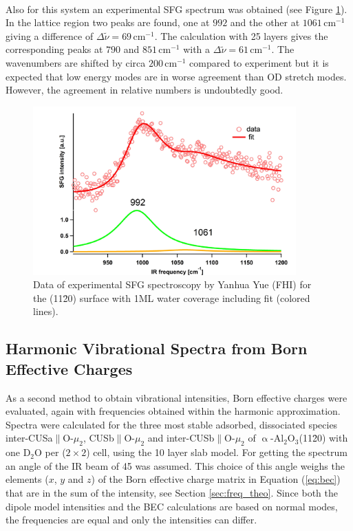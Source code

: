 \documentclass[11pt,DIV=13,BCOR=5mm,a4paper,headinclude]{scrbook}
\begin{document}
\\
Also for this system an experimental SFG spectrum was obtained (see Figure \ref{abb:exp-sfg_fully}).
In the lattice region two peaks are found, one at $992$ and the other at $1061\,$cm$^{-1}$ giving a difference of $\Delta \tilde{\nu}=69\,$cm$^{-1}$.
The calculation with 25 layers gives the corresponding peaks at $790$ and $851\,$cm$^{-1}$ %
with a $\Delta \tilde{\nu}=61\,$cm$^{-1}$.
The wavenumbers are shifted by circa $200\,$cm$^{-1}$ compared to experiment but it is expected that low energy modes are in worse agreement than OD stretch modes.
However, the agreement in relative numbers is undoubtedly good.
\begin{figure}[!h]
 \centering
\includegraphics[width=0.9\textwidth]{figures/11-20/ssp_UHV_200K_fit_hydrox.jpg}
 \caption{Data of experimental SFG spectroscopy by Yanhua Yue (FHI) for the (11\=20) surface with 1ML water coverage including fit (colored lines).}
        \label{abb:exp-sfg_fully}
 \end{figure}



\subsection{Harmonic Vibrational Spectra from Born Effective Charges}\label{bec}
As a second method to obtain vibrational intensities, Born effective charges were evaluated, again with frequencies obtained within the harmonic approximation.
Spectra were calculated for the three most stable adsorbed, dissociated species inter-CUSa$\parallel$O-$\mu_2$, CUSb$\parallel$O-$\mu_2$ and inter-CUSb$\parallel$O-$\mu_2$ of $\upalpha$-Al$_2$O$_3$(11\=20) with one D$_2$O per ($2\times 2$) cell, using the 10 layer slab model.
For getting the spectrum an angle of the IR beam of 45\textdegree{} was assumed.
This choice of this angle weighs the elements ($x$, $y$ and $z$) of the Born effective charge matrix in Equation (\ref{eq:bec}) that are in the sum of the intensity, see Section \ref{sec:freq_theo}.
Since both the dipole model intensities and the BEC calculations are based on normal modes, the frequencies are equal and only the intensities can differ.
\end{document}
